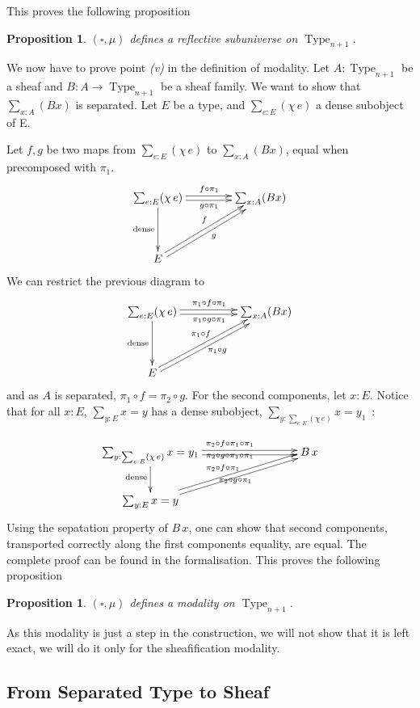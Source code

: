 \documentclass[conference]{IEEEtran}
\makeatletter
\newtheorem{prop}[thm]{Proposition}
\def\dar[#1]#2{\ar@<-#2>[#1]\ar@<#2>[#1]} %
\DeclareMathOperator{\Type}{Type}
\makeatother
\begin{document}
This proves the following proposition
\begin{prop}
  $(\square,\mu)$ defines a reflective subuniverse on $\Type_{n+1}$.
\end{prop}

We now have to prove point {\it (v)} in the definition of
modality. Let $A:\Type_{n+1}$ be a sheaf and $B:A \to \Type_{n+1}$ be
a sheaf family. We want to show that $\sum_{x:A} (Bx)$ is
separated. Let $E$ be a type, and $\sum_{e:E} (\chi\,e)$ a dense
subobject of E.

Let $f,g$ be two maps from $\sum_{e:E} (\chi\,e)$ to $\sum_{x:A}
(Bx)$, equal when precomposed with $\pi_1$.
$$\xymatrix @R=4em @C=4em{
  \sum_{e:E} (\chi\, e) \ar@<-2pt>[r]_{g\circ\pi_1} \ar@<2pt>[r]^{f\circ \pi_1} \ar[d]_{\mathrm{dense}}& \sum_{x :A} (Bx) \\
  E \ar@<-2pt>[ru]_{g} \ar@<2pt>[ru]^{f}&
}$$
We can restrict the previous diagram to 
$$\xymatrix @R=4em @C=5em{
  \sum_{e:E} (\chi\, e) \ar@<-2pt>[r]_{\pi_1\circ g\circ\pi_1} \ar@<2pt>[r]^{\pi_1\circ f\circ \pi_1} \ar[d]_{\mathrm{dense}}& \sum_{x :A} (Bx) \\
  E \ar@<-2pt>[ru]_{\pi_1\circ g} \ar@<2pt>[ru]^{\pi_1\circ f}&
}$$
and as $A$ is separated, $\pi_1\circ f = \pi_2 \circ g$.
For the second components, let $x:E$. Notice that for all $x:E$,
$\sum_{y:E} x = y$ has a dense subobject, $\sum_{y:\sum_{e:E} (\chi\,
  e)} x=y_1$~:

$$\xymatrix{
  \sum_{y:\sum_{e:E} (\chi\,
  e)} x=y_1 \dar[rrr]{2pt}^{\pi_2\circ f\circ\pi_1\circ \pi_1}_{\pi_2\circ g\circ \pi_1\circ \pi_1} \ar[d]_{\mathrm{dense}}&&& B\,x \\
  \sum_{y:E} x = y \dar[rrru]{2pt}^{\pi_2\circ f\circ \pi_1}_{\pi_2\circ g\circ \pi_1}&
}$$
Using the sepatation property of $B\,x$, one can show that second
components, transported correctly along the first components equality,
are equal. The complete proof can be found in the formalisation.
This proves the following proposition
\begin{prop}
  $(\square,\mu)$ defines a modality on $\Type_{n+1}$.
\end{prop}

As this modality is just a step in the construction, we will not show
that it is left exact, we will do it only for the sheafification modality.

\subsection{From Separated Type to Sheaf}
\label{ssec:separated-to-sheaf}
\end{document}
